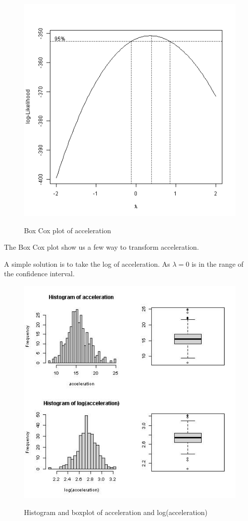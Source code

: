 \begin{figure}[H]
\centering
\includegraphics[scale=0.4]{img/accelboxcox.png}
\label{fig:my_label_with_H}
\caption{Box Cox plot of acceleration}
\end{figure}

The Box Cox plot show us a few way to transform acceleration.

A simple solution is to take the log of acceleration. As $\lambda = 0$ is in the range of the confidence interval.

\begin{figure}[H]
\centering
\includegraphics[scale=0.7]{img/acceltrans1.jpeg}
\label{fig:my_label_with_H}
\caption{Histogram and boxplot of acceleration and log(acceleration)}
\end{figure}

